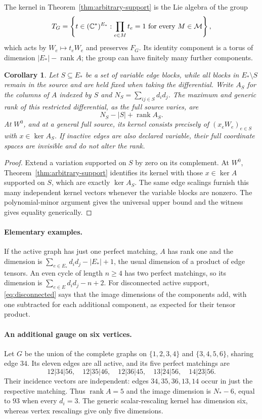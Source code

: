 \documentclass[11pt]{article}
\newtheorem{corollary}[theorem]{Corollary}
\theoremstyle{remark}\newtheorem{remark}[theorem]{Remark}
\DeclareMathOperator{\rank}{rank}
\newcommand{\C}{\mathbb C}
\begin{document}
The kernel in Theorem~\ref{thm:arbitrary-support} is the Lie algebra of
the group
\[
 T_G=\left\{t\in(\C^*)^{E_*}:\prod_{e\in M}t_e=1
          \textnormal{ for every }M\in\mathcal M\right\},
\]
which acts by $W_e\mapsto t_eW_e$ and preserves $F_G$. Its identity
component is a torus of dimension $|E_*|-\rank A$; the group can have
finitely many further components.

\begin{corollary}\label{cor:restricted-general-support}
Let $S\subseteq E_*$ be a set of variable edge blocks, while all blocks
in $E_*\setminus S$ remain in the source and are held fixed when taking
the differential. Write $A_S$ for the columns of $A$ indexed by $S$ and
$N_S=\sum_{ij\in S}d_id_j$. The maximum and generic rank of this
restricted differential, as the full source varies, are
\[
 N_S-|S|+\rank A_S.
\]
At $W^0$, and at a general full source, its kernel consists precisely
of $(x_eW_e)_{e\in S}$ with $x\in\ker A_S$. If inactive edges are
also declared variable, their full coordinate spaces are invisible
and do not alter the rank.
\end{corollary}
\begin{proof}
Extend a variation supported on $S$ by zero on its complement.
At $W^0$, Theorem~\ref{thm:arbitrary-support} identifies its kernel
with those $x\in\ker A$ supported on $S$, which are exactly
$\ker A_S$. The same edge scalings furnish this many independent
kernel vectors whenever the variable blocks are nonzero. The
polynomial-minor argument gives the universal upper bound and the
witness gives equality generically.
\end{proof}

\paragraph{Elementary examples.}
If the active graph has just one perfect matching, $A$ has rank one
and the dimension is $\sum_{e\in E_*}d_id_j-|E_*|+1$, the usual
dimension of a product of edge tensors. An even cycle of length
$n\geq4$ has two perfect matchings, so its dimension is
$\sum_{e\in E}d_id_j-n+2$. For disconnected active support,
\eqref{eq:disconnected} says that the image dimensions of the components
add, with one subtracted for each additional component, as expected for
their tensor product.

\paragraph{An additional gauge on six vertices.}
Let $G$ be the union of the complete graphs on $\{1,2,3,4\}$ and
$\{3,4,5,6\}$, sharing edge $34$. Its eleven edges are all active,
and its five perfect matchings are
\[
 12|34|56,\quad 12|35|46,\quad 12|36|45,\quad
 13|24|56,\quad 14|23|56.
\]
Their incidence vectors are independent: edges $34,35,36,13,14$
occur in just the respective matching. Thus $\rank A=5$ and the
image dimension is $N_*-6$, equal to $93$ when every $d_i=3$.
The generic scalar-rescaling kernel has dimension six, whereas vertex
rescalings give only five dimensions.
\end{document}
